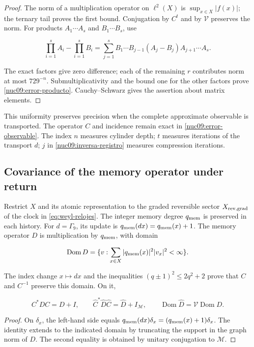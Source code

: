 \begin{proof}
The norm of a multiplication operator on \(\ell^2(X)\) is \(\sup_{x\in X}|f(x)|\); the ternary tail proves the first bound. Conjugation by \(C^t\) and by \(\mathcal V\) preserves the norm. For products \(A_1\cdots A_s\) and \(B_1\cdots B_s\), use

\[
\prod_{i=1}^s A_i-\prod_{i=1}^s B_i
=\sum_{j=1}^s B_1\cdots B_{j-1}(A_j-B_j)A_{j+1}\cdots A_s.
\]

The exact factors give zero difference; each of the remaining \(r\) contributes norm at most \(729^{-n}\). Submultiplicativity and the bound one for the other factors prove \eqref{nuc09:error-producto}. Cauchy--Schwarz gives the assertion about matrix elements.
\end{proof}

This uniformity preserves precision when the complete approximate observable is transported. The operator \(C\) and incidence remain exact in \eqref{nuc09:error-observable}. The index \(n\) measures cylinder depth; \(t\) measures iterations of the transport \(d\); \(j\) in \eqref{nuc09:inversa-registro} measures compression iterations.

\subsection{Covariance of the memory operator under return}

Restrict \(X\) and its atomic representation to the graded reversible sector \(X_{\rm rev,grad}\) of the clock in \eqref{eq:weyl-relojes}. The integer memory degree \(q_{\rm mem}\) is preserved in each history. For \(d=\Gamma_9\), its update is \(q_{\rm mem}(dx)=q_{\rm mem}(x)+1\). The memory operator \(D\) is multiplication by \(q_{\rm mem}\), with domain

\[
\operatorname{Dom}D=\{v:\sum_{x\in X}|q_{\rm mem}(x)|^2|v_x|^2<\infty\}.
\]

The index change \(x\mapsto dx\) and the inequalities \((q\pm1)^2\le2q^2+2\) prove that \(C\) and \(C^{-1}\) preserve this domain. On it,

\begin{equation}
C^*DC=D+I,\qquad
\widehat C^*\widehat D\widehat C=\widehat D+I_{\mathcal M},
\qquad\operatorname{Dom}\widehat D=\mathcal V\operatorname{Dom}D.
\label{nuc09:memoria}
\end{equation}

\begin{proof}
On \(\delta_x\), the left-hand side equals \(q_{\rm mem}(dx)\delta_x=(q_{\rm mem}(x)+1)\delta_x\). The identity extends to the indicated domain by truncating the support in the graph norm of \(D\). The second equality is obtained by unitary conjugation to \(\mathcal M\).
\end{proof}

